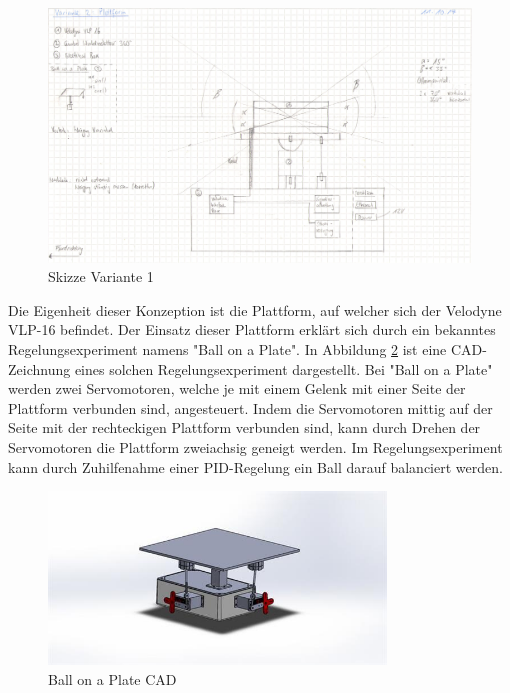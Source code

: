 \begin{figure}[H]
	\centering
	\includegraphics[width=1\textwidth]{resources/skizzev1.PNG}
	\caption[Skizze Variante 1]{Skizze Variante 1}
\label{fig:plattform}
\end{figure} 
	
 Die Eigenheit dieser Konzeption ist die Plattform, auf welcher sich der Velodyne VLP-16 befindet. Der Einsatz dieser Plattform erklärt sich durch ein bekanntes Regelungsexperiment namens "Ball on a Plate". In Abbildung \ref{fig:BalllonaPlateCAD} ist eine CAD-Zeichnung eines solchen Regelungsexperiment dargestellt. Bei "Ball on a Plate" werden zwei Servomotoren, welche je mit einem Gelenk mit einer Seite der Plattform verbunden sind, angesteuert. Indem die Servomotoren mittig auf der Seite mit der rechteckigen Plattform verbunden sind, kann durch Drehen der Servomotoren die Plattform zweiachsig geneigt werden. Im Regelungsexperiment kann durch Zuhilfenahme einer PID-Regelung ein Ball darauf balanciert werden. \cite{ballonaplate}
 
\begin{figure}[H]
	\centering
 	\includegraphics[width=0.8\textwidth]{resources/ballonaplate_cad}
	\caption[Ball on a Plate CAD]{Ball on a Plate CAD {\cite{ballonaplate}}}
	\label{fig:BalllonaPlateCAD}
\end{figure} 

